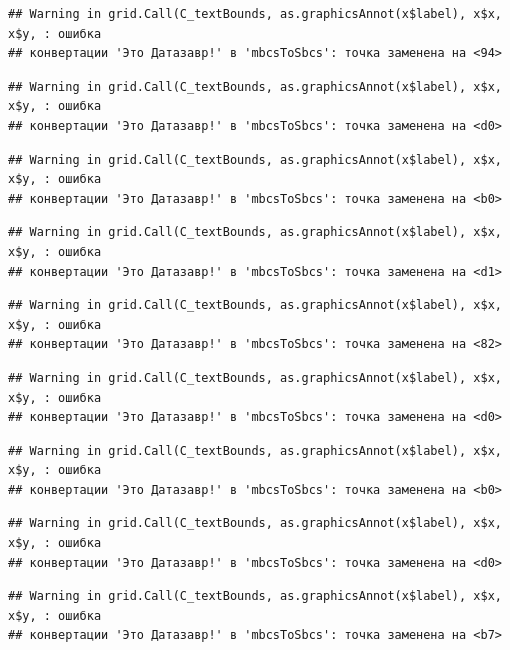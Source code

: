 \documentclass[]{book}
\begin{document}
\begin{verbatim}
## Warning in grid.Call(C_textBounds, as.graphicsAnnot(x$label), x$x, x$y, : ошибка
## конвертации 'Это Датазавр!' в 'mbcsToSbcs': точка заменена на <94>
\end{verbatim}

\begin{verbatim}
## Warning in grid.Call(C_textBounds, as.graphicsAnnot(x$label), x$x, x$y, : ошибка
## конвертации 'Это Датазавр!' в 'mbcsToSbcs': точка заменена на <d0>
\end{verbatim}

\begin{verbatim}
## Warning in grid.Call(C_textBounds, as.graphicsAnnot(x$label), x$x, x$y, : ошибка
## конвертации 'Это Датазавр!' в 'mbcsToSbcs': точка заменена на <b0>
\end{verbatim}

\begin{verbatim}
## Warning in grid.Call(C_textBounds, as.graphicsAnnot(x$label), x$x, x$y, : ошибка
## конвертации 'Это Датазавр!' в 'mbcsToSbcs': точка заменена на <d1>
\end{verbatim}

\begin{verbatim}
## Warning in grid.Call(C_textBounds, as.graphicsAnnot(x$label), x$x, x$y, : ошибка
## конвертации 'Это Датазавр!' в 'mbcsToSbcs': точка заменена на <82>
\end{verbatim}

\begin{verbatim}
## Warning in grid.Call(C_textBounds, as.graphicsAnnot(x$label), x$x, x$y, : ошибка
## конвертации 'Это Датазавр!' в 'mbcsToSbcs': точка заменена на <d0>
\end{verbatim}

\begin{verbatim}
## Warning in grid.Call(C_textBounds, as.graphicsAnnot(x$label), x$x, x$y, : ошибка
## конвертации 'Это Датазавр!' в 'mbcsToSbcs': точка заменена на <b0>
\end{verbatim}

\begin{verbatim}
## Warning in grid.Call(C_textBounds, as.graphicsAnnot(x$label), x$x, x$y, : ошибка
## конвертации 'Это Датазавр!' в 'mbcsToSbcs': точка заменена на <d0>
\end{verbatim}

\begin{verbatim}
## Warning in grid.Call(C_textBounds, as.graphicsAnnot(x$label), x$x, x$y, : ошибка
## конвертации 'Это Датазавр!' в 'mbcsToSbcs': точка заменена на <b7>
\end{verbatim}
\end{document}
